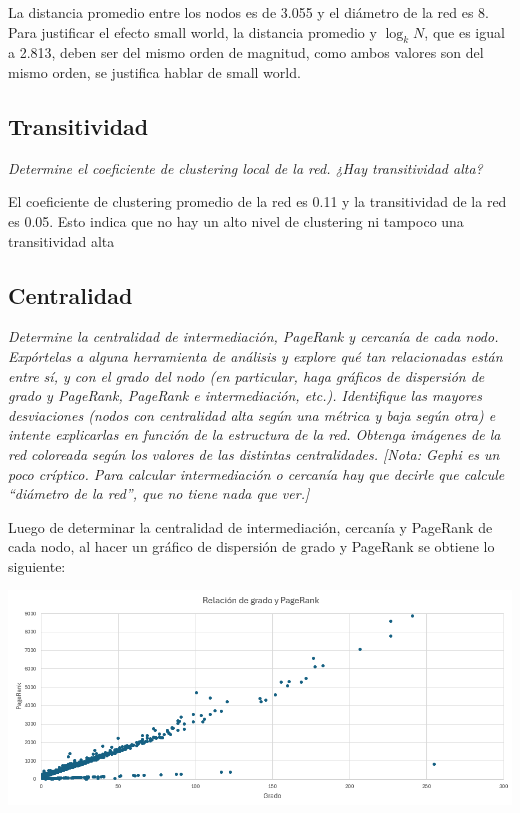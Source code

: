 \documentclass[12pt]{article}
\begin{document}
La distancia promedio entre los nodos es de 3.055 y el diámetro de la red es 8. Para justificar el efecto small world, la distancia promedio y $\log_{k} N$, que es igual a 2.813, deben ser del mismo orden de magnitud, como ambos valores son del mismo orden, se justifica hablar de small world.


\subsection{Transitividad} 
\textit{Determine el coeficiente de clustering local de la red. ¿Hay transitividad alta?}

El coeficiente de clustering promedio de la red es 0.11 y la transitividad de la red es 0.05. Esto indica que no hay un alto nivel de clustering ni tampoco una transitividad alta


\subsection{Centralidad}  
\textit{Determine la centralidad de intermediación, PageRank y cercanía de cada nodo. Expórtelas a alguna herramienta de análisis y explore qué tan relacionadas están entre sí, y con el grado del nodo (en particular, haga gráficos de dispersión de grado y PageRank, PageRank e intermediación, etc.). Identifique las mayores desviaciones (nodos con centralidad alta según una métrica y baja según otra) e intente explicarlas en función de la estructura de la red. Obtenga imágenes de la red coloreada según los valores de las distintas centralidades. [Nota: Gephi es un poco críptico. Para calcular intermediación o cercanía hay que decirle que calcule ``diámetro de la red'', que no tiene nada que ver.]}

Luego de determinar la centralidad de intermediación, cercanía y PageRank de cada nodo, al hacer un gráfico de dispersión de grado y PageRank se obtiene lo siguiente:

\begin{center}
    \includegraphics[scale=0.6]{images/distribucion_grado_pagerank.png}
\end{center}
\end{document}
